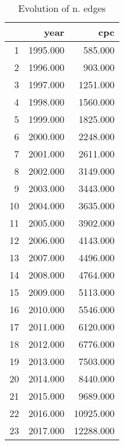 \begin{table}[ht]
\centering
\begin{tabular}{rrr}
  \hline
 & year & cpc \\ 
  \hline
1 & 1995.000 & 585.000 \\ 
  2 & 1996.000 & 903.000 \\ 
  3 & 1997.000 & 1251.000 \\ 
  4 & 1998.000 & 1560.000 \\ 
  5 & 1999.000 & 1825.000 \\ 
  6 & 2000.000 & 2248.000 \\ 
  7 & 2001.000 & 2611.000 \\ 
  8 & 2002.000 & 3149.000 \\ 
  9 & 2003.000 & 3443.000 \\ 
  10 & 2004.000 & 3635.000 \\ 
  11 & 2005.000 & 3902.000 \\ 
  12 & 2006.000 & 4143.000 \\ 
  13 & 2007.000 & 4496.000 \\ 
  14 & 2008.000 & 4764.000 \\ 
  15 & 2009.000 & 5113.000 \\ 
  16 & 2010.000 & 5546.000 \\ 
  17 & 2011.000 & 6120.000 \\ 
  18 & 2012.000 & 6776.000 \\ 
  19 & 2013.000 & 7503.000 \\ 
  20 & 2014.000 & 8440.000 \\ 
  21 & 2015.000 & 9689.000 \\ 
  22 & 2016.000 & 10925.000 \\ 
  23 & 2017.000 & 12288.000 \\ 
   \hline
\end{tabular}
\caption{Evolution of n. edges} 
\end{table}
